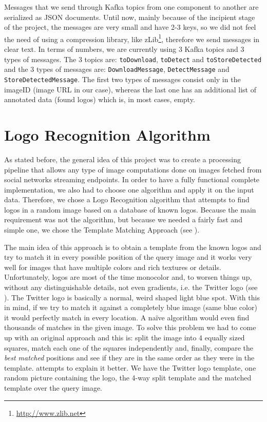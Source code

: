 Messages that we send through Kafka topics from one component to another are
serialized as JSON documents. Until now, mainly because of the incipient stage
of the project, the messages are very small and have 2-3 keys, so we did not
feel the need of using a compression library, like
zLib\footnote{\url{http://www.zlib.net}}, therefore we send messages in clear
text. In terms of numbers, we are currently using 3 Kafka topics and 3 types
of messages. The 3 topics are: \texttt{toDownload}, \texttt{toDetect} and
\texttt{toStoreDetected} and the 3 types of messages are:
\texttt{DownloadMessage}, \texttt{DetectMessage} and
\texttt{StoreDetectedMessage}. The first two types of messages consist only in
the imageID (image URL in our case), whereas the last one has an additional
list of annotated data (found logos) which is, in most cases, empty.


\section{Logo Recognition Algorithm}
\label{sec:logo-alg}

As stated before, the general idea of this project was to create a processing
pipeline that allows any type of image computations done on images fetched
from social networks streaming endpoints. In order to have a fully functional
complete implementation, we also had to choose one algorithm and apply it on
the input data. Therefore, we chose a Logo Recognition algorithm that attempts
to find logos in a random image based on a database of known logos. Because
the main requirement was not the algorithm, but because we needed a fairly
fast and simple one, we chose the Template Matching Approach (see
).

The main idea of this approach is to obtain a template from the known logos
and try to match it in every possible position of the query image and it works
very well for images that have multiple colors and rich textures or details.
Unfortunately, logos are most of the time monocolor and, to worsen things up,
without any distinguishable details, not even gradients, i.e. the Twitter
logo (see ). The Twitter logo is basically
a normal, weird shaped light blue spot. With this in mind, if we try to match
it against a completely blue image (same blue color) it would perfectly match
in every location. A na{\"i}ve algorithm would even find thousands of matches
in the given image. To solve this problem we had to come up with an original
approach and this is: split the image into 4 equally sized squares, match
each one of the squares independently and, finally, compare the \textit{best
matched} positions and see if they are in the same order as they were in the
template.  attempts to explain it better.
We have the Twitter logo template, one random picture containing the logo,
the 4-way split template and the matched template over the query image.


